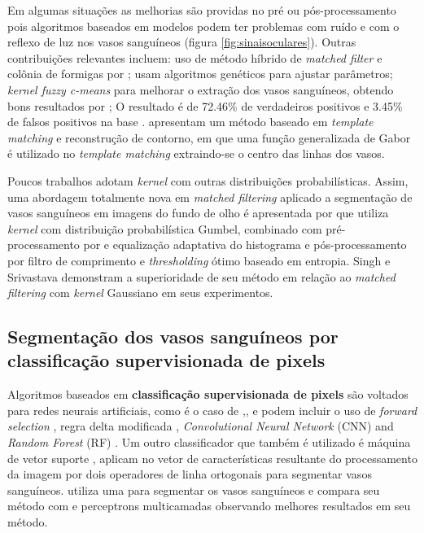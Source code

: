  Em algumas situações as melhorias são providas no pré ou pós-processamento pois algoritmos baseados em modelos podem ter problemas com ruído e com o reflexo de luz nos vasos sanguíneos (figura \ref{fig:sinaisoculares}). Outras contribuições relevantes incluem: uso de método híbrido de \textit{matched filter} e colônia de formigas por ;   usam algoritmos genéticos para ajustar parâmetros; \textit{kernel fuzzy c-means} para melhorar o extração dos vasos sanguíneos, obtendo bons resultados por ;  O resultado é de 72.46\% de verdadeiros positivos e 3.45\% de falsos positivos na base  \cite{DRIVE}.    apresentam um método baseado em \textit{template matching} e reconstrução de contorno, em que uma função generalizada de Gabor é utilizado no \textit{template matching} extraindo-se o centro das linhas dos vasos. 

Poucos trabalhos adotam \textit{kernel} com outras distribuições probabilísticas. Assim, uma abordagem totalmente nova em \textit{matched filtering} aplicado a segmentação de vasos sanguíneos em imagens do fundo de olho é apresentada por   que  utiliza \textit{kernel} com distribuição probabilística Gumbel, combinado com pré-processamento por  e equalização adaptativa do histograma e pós-processamento por filtro de comprimento e \textit{thresholding} ótimo baseado em entropia. Singh e Srivastava demonstram a superioridade de seu método em relação ao \textit{matched filtering} com \textit{kernel} Gaussiano em seus experimentos. 

\subsection{Segmentação dos vasos sanguíneos por classificação supervisionada de pixels}

Algoritmos baseados em \textbf{classificação supervisionada de pixels}  são voltados para redes neurais artificiais, como é o caso de  ,,  
e podem incluir o uso de \textit{forward selection}  \cite{DRIVE},
regra delta modificada \cite{Nekovei1991},
\textit{Convolutional Neural Network} (CNN) and \textit{Random Forest} (RF) \cite{Wang2015}. Um outro classificador que também é utilizado é máquina de vetor suporte ,  aplicam  no vetor de características resultante do processamento da imagem por dois operadores de linha ortogonais para segmentar vasos sanguíneos.  utiliza uma  para segmentar os vasos sanguíneos e compara seu método com  e perceptrons multicamadas observando melhores resultados em seu método.


